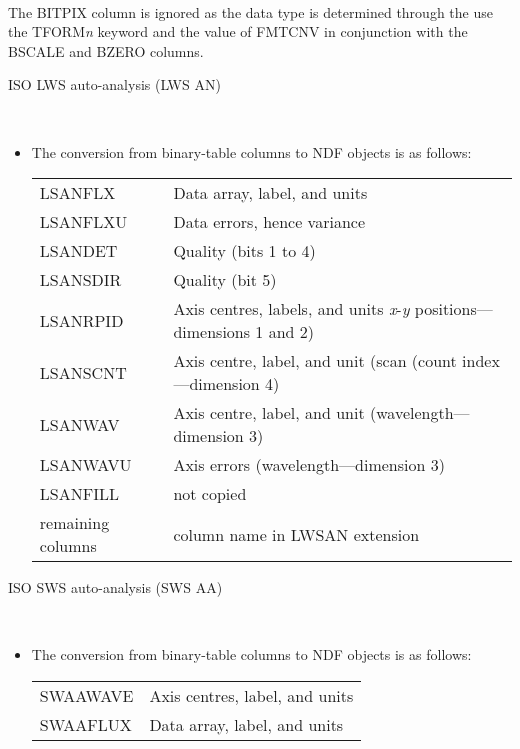\documentclass[twoside,11pt]{article}
\newcommand{\latex}[1]{#1}
\newcommand{\ssthitemlist}[1]{
  \latex{
  \mbox{} \\
  \vspace{-3.5ex}
  }
  \begin{itemize}
     #1
  \end{itemize}
}
\newcommand{\sstitem}{\item}
\newcommand{\sstitem}{\item}
\begin{document}
{{{{            \\[\medskipamount]
            The BITPIX column is ignored as the data type is determined
            through the use the TFORM\textit{n} keyword and the value of 
            FMTCNV in conjunction with the BSCALE and BZERO columns.
         }
         \bigskip
         \sstitem
         ISO LWS auto-analysis (LWS AN)
         \ssthitemlist{
            \sstitem
            The conversion from binary-table columns to NDF objects is
            as follows:
            \\[\medskipamount]
            \begin{tabular}{lp{90mm}}
               LSANFLX            &   Data array, label, and units \\
               LSANFLXU           &   Data errors, hence variance \\
               LSANDET            &   Quality (bits 1 to 4) \\
               LSANSDIR           &   Quality (bit 5) \\
               LSANRPID           &   Axis centres, labels, and units
                                      \textit{x}-\textit{y} positions---
                                      dimensions 1 and 2) \\
               LSANSCNT           &   Axis centre, label, and unit (scan
                                      (count index---dimension 4) \\
               LSANWAV            &   Axis centre, label, and unit
                                      (wavelength---dimension 3) \\
               LSANWAVU           &   Axis errors (wavelength---dimension 3) \\
               LSANFILL           &   not copied \\
               remaining columns  &   column name in LWSAN extension \\
            \end{tabular}
         }
         \bigskip
         \sstitem
         ISO SWS auto-analysis (SWS AA)
         \ssthitemlist{
            \sstitem
            The conversion from binary-table columns to NDF objects is
            as follows:
            \\[\medskipamount]
            \begin{tabular}{ll}
               SWAAWAVE           &   Axis centres, label, and units \\
               SWAAFLUX           &   Data array, label, and units \\

\end{tabular}}}}}
\end{document}
